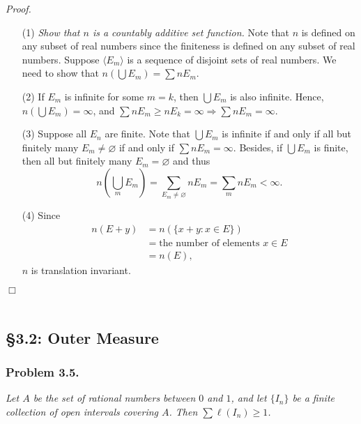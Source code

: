 \documentclass{article}
\begin{document}
\emph{Proof.}
\begin{enumerate}
\item[(1)]
  \emph{Show that $n$ is a countably additive set function.}
  Note that $n$ is defined on any subset of real numbers
  since the finiteness is defined on any subset of real numbers.
  Suppose $\langle E_m \rangle$ is a sequence of disjoint sets of real numbers.
  We need to show that $n\left( \bigcup E_m \right) = \sum n E_m$.

\item[(2)]
  If $E_m$ is infinite for some $m = k$, then $\bigcup E_m$ is also infinite.
  Hence, $n \left( \bigcup E_m \right) = \infty$,
  and $\sum n E_m \geq n E_k = \infty \Longrightarrow \sum n E_m = \infty$.

\item[(3)]
  Suppose all $E_n$ are finite.
  Note that
  $\bigcup E_m$ is infinite if and only if all but finitely many $E_m \neq \varnothing$
  if and only if $\sum n E_m = \infty$.
  Besides, if $\bigcup E_m$ is finite, then all but finitely many $E_m = \varnothing$
  and thus
  \[
    n\left( \bigcup_m E_m \right)
    = \sum_{E_m \neq \varnothing} n E_m
    = \sum_{m} n E_m
    < \infty.
  \]

\item[(4)]
  Since
  \begin{align*}
    n(E+y)
    &= n(\{ x + y : x \in E\}) \\
    &= \text{the number of elements $x \in E$} \\
    &= n(E),
  \end{align*}
  $n$ is translation invariant.
\end{enumerate}
$\Box$ \\\\






\subsection*{\S 3.2: Outer Measure \\}



\subsubsection*{Problem 3.5.}
\emph{Let $A$ be the set of rational numbers between $0$ and $1$, and
let $\{ I_n \}$ be a finite collection of open intervals covering $A$.
Then $\sum \ell(I_n) \geq 1$.} \\
\end{document}
